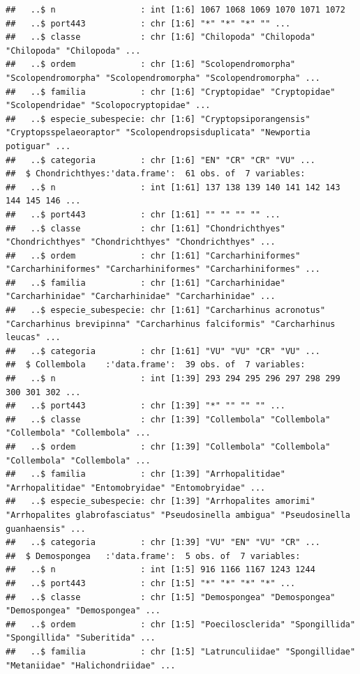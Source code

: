 \documentclass[
]{article}
\begin{document}
\begin{verbatim}
##   ..$ n                 : int [1:6] 1067 1068 1069 1070 1071 1072
##   ..$ port443           : chr [1:6] "*" "*" "*" "" ...
##   ..$ classe            : chr [1:6] "Chilopoda" "Chilopoda" "Chilopoda" "Chilopoda" ...
##   ..$ ordem             : chr [1:6] "Scolopendromorpha" "Scolopendromorpha" "Scolopendromorpha" "Scolopendromorpha" ...
##   ..$ familia           : chr [1:6] "Cryptopidae" "Cryptopidae" "Scolopendridae" "Scolopocryptopidae" ...
##   ..$ especie_subespecie: chr [1:6] "Cryptopsiporangensis" "Cryptopsspelaeoraptor" "Scolopendropsisduplicata" "Newportia potiguar" ...
##   ..$ categoria         : chr [1:6] "EN" "CR" "CR" "VU" ...
##  $ Chondrichthyes:'data.frame':  61 obs. of  7 variables:
##   ..$ n                 : int [1:61] 137 138 139 140 141 142 143 144 145 146 ...
##   ..$ port443           : chr [1:61] "" "" "" "" ...
##   ..$ classe            : chr [1:61] "Chondrichthyes" "Chondrichthyes" "Chondrichthyes" "Chondrichthyes" ...
##   ..$ ordem             : chr [1:61] "Carcharhiniformes" "Carcharhiniformes" "Carcharhiniformes" "Carcharhiniformes" ...
##   ..$ familia           : chr [1:61] "Carcharhinidae" "Carcharhinidae" "Carcharhinidae" "Carcharhinidae" ...
##   ..$ especie_subespecie: chr [1:61] "Carcharhinus acronotus" "Carcharhinus brevipinna" "Carcharhinus falciformis" "Carcharhinus leucas" ...
##   ..$ categoria         : chr [1:61] "VU" "VU" "CR" "VU" ...
##  $ Collembola    :'data.frame':  39 obs. of  7 variables:
##   ..$ n                 : int [1:39] 293 294 295 296 297 298 299 300 301 302 ...
##   ..$ port443           : chr [1:39] "*" "" "" "" ...
##   ..$ classe            : chr [1:39] "Collembola" "Collembola" "Collembola" "Collembola" ...
##   ..$ ordem             : chr [1:39] "Collembola" "Collembola" "Collembola" "Collembola" ...
##   ..$ familia           : chr [1:39] "Arrhopalitidae" "Arrhopalitidae" "Entomobryidae" "Entomobryidae" ...
##   ..$ especie_subespecie: chr [1:39] "Arrhopalites amorimi" "Arrhopalites glabrofasciatus" "Pseudosinella ambigua" "Pseudosinella guanhaensis" ...
##   ..$ categoria         : chr [1:39] "VU" "EN" "VU" "CR" ...
##  $ Demospongea   :'data.frame':  5 obs. of  7 variables:
##   ..$ n                 : int [1:5] 916 1166 1167 1243 1244
##   ..$ port443           : chr [1:5] "*" "*" "*" "*" ...
##   ..$ classe            : chr [1:5] "Demospongea" "Demospongea" "Demospongea" "Demospongea" ...
##   ..$ ordem             : chr [1:5] "Poecilosclerida" "Spongillida" "Spongillida" "Suberitida" ...
##   ..$ familia           : chr [1:5] "Latrunculiidae" "Spongillidae" "Metaniidae" "Halichondriidae" ...

\end{verbatim}
\end{document}
